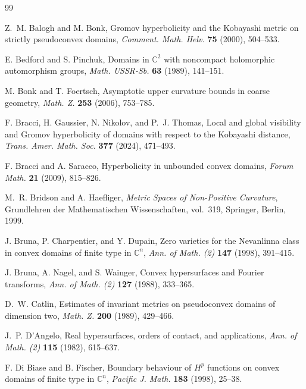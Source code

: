 \documentclass[11pt]{article}
\theoremstyle{definition}
\newcommand{\C}{\mathbb{C}}
\begin{document}
\begin{thebibliography}{99}
	
	Z.~M. Balogh and M. Bonk,
	Gromov hyperbolicity and the Kobayashi metric on strictly pseudoconvex
	domains,
	\emph{Comment. Math. Helv.} \textbf{75} (2000), 504--533.
	
	E. Bedford and S. Pinchuk,
	Domains in \(\C^2\) with noncompact holomorphic automorphism groups,
	\emph{Math. USSR-Sb.} \textbf{63} (1989), 141--151.
	
	M. Bonk and T. Foertsch,
	Asymptotic upper curvature bounds in coarse geometry,
	\emph{Math. Z.} \textbf{253} (2006), 753--785.
	
	F. Bracci, H. Gaussier, N. Nikolov, and P.~J. Thomas,
	Local and global visibility and Gromov hyperbolicity of domains with
	respect to the Kobayashi distance,
	\emph{Trans. Amer. Math. Soc.} \textbf{377} (2024), 471--493.
	
	F. Bracci and A. Saracco,
	Hyperbolicity in unbounded convex domains,
	\emph{Forum Math.} \textbf{21} (2009), 815--826.
	
	M.~R. Bridson and A. Haefliger,
	\emph{Metric Spaces of Non-Positive Curvature},
	Grundlehren der Mathematischen Wissenschaften, vol.~319,
	Springer, Berlin, 1999.
	
	J. Bruna, P. Charpentier, and Y. Dupain,
	Zero varieties for the Nevanlinna class in convex domains of finite type
	in \(\C^n\),
	\emph{Ann. of Math. (2)} \textbf{147} (1998), 391--415.
	
	J. Bruna, A. Nagel, and S. Wainger,
	Convex hypersurfaces and Fourier transforms,
	\emph{Ann. of Math. (2)} \textbf{127} (1988), 333--365.
	
	D.~W. Catlin,
	Estimates of invariant metrics on pseudoconvex domains of dimension two,
	\emph{Math. Z.} \textbf{200} (1989), 429--466.
	
	J.~P. D'Angelo,
	Real hypersurfaces, orders of contact, and applications,
	\emph{Ann. of Math. (2)} \textbf{115} (1982), 615--637.
	
	F. Di Biase and B. Fischer,
	Boundary behaviour of \(H^p\) functions on convex domains of finite type
	in \(\C^n\),
	\emph{Pacific J. Math.} \textbf{183} (1998), 25--38.
	

\end{thebibliography}
\end{document}
